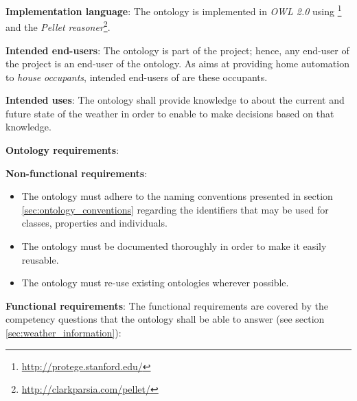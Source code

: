 \begin{mdframed}[linewidth=.6pt]
\vspace{.3cm}

\textbf{Implementation language}: The ontology is implemented in \emph{OWL 2.0}\cite{OWL} using \protege\footnote{\href{http://protege.stanford.edu/}{http://protege.stanford.edu/}} and the \emph{Pellet reasoner}\footnote{\href{http://clarkparsia.com/pellet/}{http://clarkparsia.com/pellet/}}.

\vspace{.3cm}

\textbf{Intended end-users}: The ontology is part of the \thinkhome project; hence, any end-user of the \thinkhome project is an end-user of the \thinkhomeweather ontology. As \thinkhome aims at providing home automation to \emph{house occupants}, intended end-users of \thinkhomeweather are these occupants.

\vspace{.3cm}

\textbf{Intended uses}: The ontology shall provide knowledge to \thinkhome about the current and future state of the weather in order to enable \thinkhome to make decisions based on that knowledge.

\vspace{.3cm}

\textbf{Ontology requirements}:

\vspace{.3cm}

\setlength{\leftskip}{.5cm}

\textbf{Non-functional requirements}:

\begin{itemize}
  \item The ontology must adhere to the naming conventions presented in section \ref{sec:ontology_conventions} regarding the identifiers that may be used for classes, properties and individuals.
  \item The ontology must be documented thoroughly in order to make it easily reusable.
  \item The ontology must re-use existing ontologies wherever possible.
\end{itemize}

\textbf{Functional requirements}: The functional requirements are covered by the competency questions that the ontology shall be able to answer (see section \ref{sec:weather_information}):


\end{mdframed}
